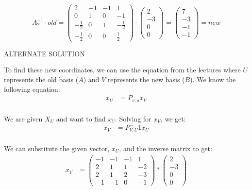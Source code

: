 \documentclass[12pt]{article}
\begin{document}
\[
A_2^{-1} \cdot old  = 
\begin{pmatrix}
2 & -1 & -1 & 1\\
0 & 1 & 0 & -1 \\
-\frac{1}{2} & 0 & 1 & -\frac{1}{2} \\
-\frac{1}{2} & 0 & 0 & \frac{1}{2}
\end{pmatrix}\cdot 
\begin{pmatrix}
2\\
-3\\
0\\
0
\end{pmatrix} =
\begin{pmatrix}
7\\
-3\\
-1\\
-1
\end{pmatrix} = new
\] 


ALTERNATE SOLUTION
\newline 

To find these new coordinates, we can use the equation from the lectures where $U$ represents the old basis ($A$) and $V$ represents the new basis ($B$). We know the following equation: \\
\begin{align*}
    x_U &= P_{v,u}x_V \\
\end{align*}

We are given  $X_U$ and want to find $x_V$. Solving for $x_V$, we get: 
\begin{align*}
    x_V &= P_{V,U}^-1x_U \\
\end{align*}

We can substitute the given vector, $x_U$, and the inverse matrix to get:
\begin{align*}
    x_V &= \begin{pmatrix}
    -1 & -1 & -1 & 1\\
    2 & 1 & 1 & -2 \\
    2 & 1 & 2 & -3 \\
    -1 & -1 & 0 & -1
    \end{pmatrix} * \begin{pmatrix}
    2 \\
    -3 \\
    0 \\
    0 
    \end{pmatrix} \\
    \end{align*}
\end{document}
